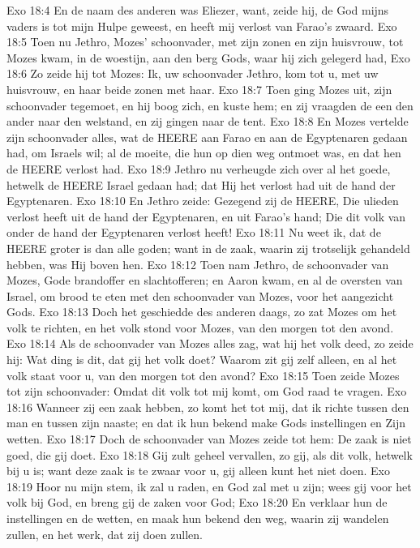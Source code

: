 Exo 18:4  En de naam des anderen was Eliezer, want, zeide hij, de God mijns vaders is tot mijn Hulpe geweest, en heeft mij verlost van Farao's zwaard.
Exo 18:5  Toen nu Jethro, Mozes' schoonvader, met zijn zonen en zijn huisvrouw, tot Mozes kwam, in de woestijn, aan den berg Gods, waar hij zich gelegerd had,
Exo 18:6  Zo zeide hij tot Mozes: Ik, uw schoonvader Jethro, kom tot u, met uw huisvrouw, en haar beide zonen met haar.
Exo 18:7  Toen ging Mozes uit, zijn schoonvader tegemoet, en hij boog zich, en kuste hem; en zij vraagden de een den ander naar den welstand, en zij gingen naar de tent.
Exo 18:8  En Mozes vertelde zijn schoonvader alles, wat de HEERE aan Farao en aan de Egyptenaren gedaan had, om Israels wil; al de moeite, die hun op dien weg ontmoet was, en dat hen de HEERE verlost had.
Exo 18:9  Jethro nu verheugde zich over al het goede, hetwelk de HEERE Israel gedaan had; dat Hij het verlost had uit de hand der Egyptenaren.
Exo 18:10  En Jethro zeide: Gezegend zij de HEERE, Die ulieden verlost heeft uit de hand der Egyptenaren, en uit Farao's hand; Die dit volk van onder de hand der Egyptenaren verlost heeft!
Exo 18:11  Nu weet ik, dat de HEERE groter is dan alle goden; want in de zaak, waarin zij trotselijk gehandeld hebben, was Hij boven hen.
Exo 18:12  Toen nam Jethro, de schoonvader van Mozes, Gode brandoffer en slachtofferen; en Aaron kwam, en al de oversten van Israel, om brood te eten met den schoonvader van Mozes, voor het aangezicht Gods.
Exo 18:13  Doch het geschiedde des anderen daags, zo zat Mozes om het volk te richten, en het volk stond voor Mozes, van den morgen tot den avond.
Exo 18:14  Als de schoonvader van Mozes alles zag, wat hij het volk deed, zo zeide hij: Wat ding is dit, dat gij het volk doet? Waarom zit gij zelf alleen, en al het volk staat voor u, van den morgen tot den avond?
Exo 18:15  Toen zeide Mozes tot zijn schoonvader: Omdat dit volk tot mij komt, om God raad te vragen.
Exo 18:16  Wanneer zij een zaak hebben, zo komt het tot mij, dat ik richte tussen den man en tussen zijn naaste; en dat ik hun bekend make Gods instellingen en Zijn wetten.
Exo 18:17  Doch de schoonvader van Mozes zeide tot hem: De zaak is niet goed, die gij doet.
Exo 18:18  Gij zult geheel vervallen, zo gij, als dit volk, hetwelk bij u is; want deze zaak is te zwaar voor u, gij alleen kunt het niet doen.
Exo 18:19  Hoor nu mijn stem, ik zal u raden, en God zal met u zijn; wees gij voor het volk bij God, en breng gij de zaken voor God;
Exo 18:20  En verklaar hun de instellingen en de wetten, en maak hun bekend den weg, waarin zij wandelen zullen, en het werk, dat zij doen zullen.
